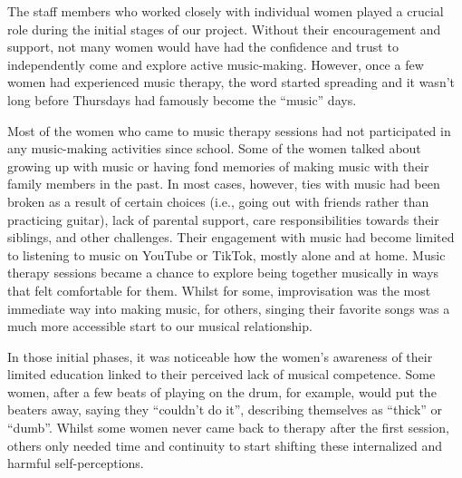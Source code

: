 \documentclass[authordate, empirical]{jote-new-article}
\begin{document}
The staff members who worked closely with individual women played a crucial role during the initial stages of our project. Without their encouragement and support, not many women would have had the confidence and trust to independently come and explore active music-making. However, once a few women had experienced music therapy, the word started spreading and it wasn't long before Thursdays had famously become the “music” days.







Most of the women who came to music therapy sessions had not participated in any music-making activities since school. Some of the women talked about growing up with music or having fond memories of making music with their family members in the past. In most cases, however, ties with music had been broken as a result of certain choices (i.e., going out with friends rather than practicing guitar), lack of parental support, care responsibilities towards their siblings, and other challenges. Their engagement with music had become limited to listening to music on YouTube or TikTok, mostly alone and at home. Music therapy sessions became a chance to explore being together musically in ways that felt comfortable for them. Whilst for some, improvisation was the most immediate way into making music, for others, singing their favorite songs was a much more accessible start to our musical relationship.







In those initial phases, it was noticeable how the women's awareness of their limited education linked to their perceived lack of musical competence. Some women, after a few beats of playing on the drum, for example, would put the beaters away, saying they “couldn't do it”, describing themselves as “thick” or “dumb”. Whilst some women never came back to therapy after the first session, others only needed time and continuity to start shifting these internalized and harmful self-perceptions.
\end{document}
